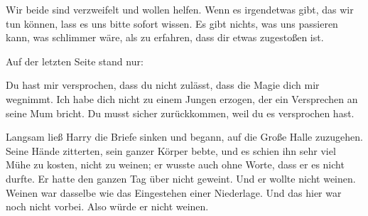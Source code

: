 \begin{writtenNote}
Wir beide sind verzweifelt und wollen helfen. Wenn es irgendetwas gibt, das wir tun können, lass es uns bitte sofort wissen. Es gibt nichts, was uns passieren kann, was schlimmer wäre, als zu erfahren, dass dir etwas zugestoßen ist.

\end{writtenNote}

Auf der letzten Seite stand nur:

\begin{writtenNote}
Du hast mir versprochen, dass du nicht zulässt, dass die Magie dich mir wegnimmt. Ich habe dich nicht zu einem Jungen erzogen, der ein Versprechen an seine Mum bricht. Du musst sicher zurückkommen, weil du es versprochen hast.

\end{writtenNote}

Langsam ließ Harry die Briefe sinken und begann, auf die Große Halle zuzugehen. Seine Hände zitterten, sein ganzer Körper bebte, und es schien ihn sehr viel Mühe zu kosten, nicht zu weinen; er wusste auch ohne Worte, dass er es nicht durfte. Er hatte den ganzen Tag über nicht geweint. Und er wollte nicht weinen. Weinen war dasselbe wie das Eingestehen einer Niederlage. Und das hier war noch nicht vorbei. Also würde er nicht weinen.

\later

